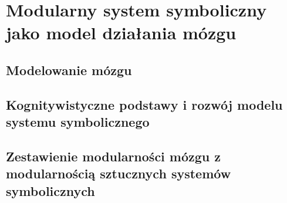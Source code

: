 \chapter{Modularny system symboliczny jako model działania mózgu}

\section{Modelowanie mózgu}

\section{Kognitywistyczne podstawy i rozwój modelu systemu symbolicznego}

\section{Zestawienie modularności mózgu z modularnością sztucznych systemów symbolicznych}

